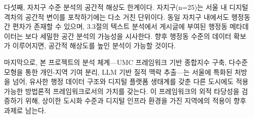 다섯째, 자치구 수준 분석의 공간적 해상도 한계이다. 자치구(n=25)는 서울 내 디지털 격차의 공간적 변이를 포착하기에는 다소 거친 단위이다. 동일 자치구 내에서도 행정동 간 편차가 존재할 수 있으며, 3.3절의 텍스트 분석에서 게시글에 부여된 행정동 메타데이터는 보다 세밀한 공간 분석의 가능성을 시사한다. 향후 행정동 수준의 데이터 확보가 이루어지면, 공간적 해상도를 높인 분석이 가능할 것이다.

마지막으로, 본 프로젝트의 분석 체계---UMC 프레임워크 기반 종합지수 구축, 다수준 모형을 통한 개인-지역 기여 분리, LLM 기반 질적 맥락 추출---는 서울에 특화된 처방을 넘어, 유사한 행정 데이터 구조와 디지털 플랫폼 생태계를 갖춘 다른 도시에도 적용 가능한 방법론적 프레임워크로서의 가치를 갖는다. 이 프레임워크의 외적 타당성을 검증하기 위해, 상이한 도시화 수준과 디지털 인프라 환경을 가진 지역에의 적용이 향후 과제로 남는다.
